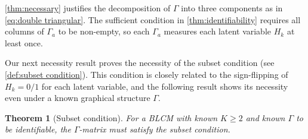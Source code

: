 \documentclass[10pt]{article} %
\newtheorem{theorem}{Theorem}
\begin{document}
\cref{thm:necessary} justifies the decomposition of $\Gamma$ into three components as in \eqref{eq:double triangular}. The sufficient condition in \cref{thm:identifiability} requires all columns of $\Gamma_a$ to be non-empty, so each $\Gamma_a$ measures each latent variable $H_k$ at least once.
%
%
%
%

Our next necessity result proves the necessity of the subset condition (see \cref{def:subset condition}). This condition is closely related to the sign-flipping of $H_k = 0/ 1$ for each latent variable, and the following result shows its necessity even under a known graphical structure $\Gamma$. 
%

\begin{theorem}[Subset condition]\label{thm:subset necessary}
    For a BLCM with known $K \ge 2$ and known $\Gamma$ to be identifiable, the $\Gamma$-matrix must satisfy the subset condition.
\end{theorem}
\end{document}
